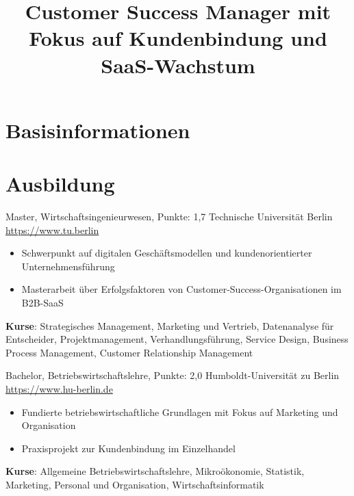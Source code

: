 \documentclass[a4paper, serif, 10pt]{moderncv}
\title{Customer Success Manager mit Fokus auf Kundenbindung und SaaS-Wachstum}
\begin{document}
\maketitle

\section{Basisinformationen}

\section{Ausbildung}

        {Master, Wirtschaftsingenieurwesen, Punkte: 1,7}
        {Technische Universität Berlin}
        {\url{https://www.tu.berlin}}
        {}
        {\begin{itemize}
\item Schwerpunkt auf digitalen Geschäftsmodellen und kundenorientierter Unternehmensführung
\item Masterarbeit über Erfolgsfaktoren von Customer-Success-Organisationen im B2B-SaaS
\end{itemize}
\textbf{Kurse}: Strategisches Management, Marketing und Vertrieb, Datenanalyse für Entscheider, Projektmanagement, Verhandlungsführung, Service Design, Business Process Management, Customer Relationship Management}

        {Bachelor, Betriebswirtschaftslehre, Punkte: 2,0}
        {Humboldt-Universität zu Berlin}
        {\url{https://www.hu-berlin.de}}
        {}
        {\begin{itemize}
\item Fundierte betriebswirtschaftliche Grundlagen mit Fokus auf Marketing und Organisation
\item Praxisprojekt zur Kundenbindung im Einzelhandel
\end{itemize}
\textbf{Kurse}: Allgemeine Betriebswirtschaftslehre, Mikroökonomie, Statistik, Marketing, Personal und Organisation, Wirtschaftsinformatik}
\end{document}
